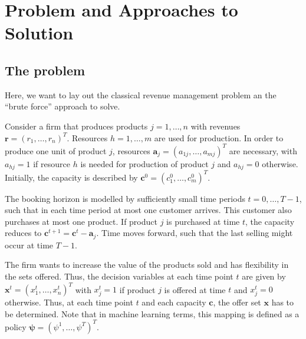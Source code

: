 \chapter{Problem and Approaches to Solution}


\section{The problem}

Here, we want to lay out the classical revenue management problem an the \enquote{brute force} approach to solve. 

Consider a firm that produces products $j = 1, \dots, n$ with revenues $\boldsymbol{r} = (r_1, \dots, r_n)^T$. Resources $h = 1, \dots, m$ are used for production. In order to produce one unit of product $j$, resources $\boldsymbol{a}_j = (a_{1j}, \dots, a_{mj})^T$ are necessary, with $a_{hj}=1$ if resource $h$ is needed for production of product $j$ and $a_{hj} = 0$ otherwise. Initially, the capacity is described by $\boldsymbol{c}^0 = (c_1^0, \dots, c_m^0)^T$. 

The booking horizon is modelled by sufficiently small time periods $t = 0, \dots, T-1$, such that in each time period at most one customer arrives. This customer also purchases at most one product. If product $j$ is purchased at time $t$, the capacity reduces to $\boldsymbol{c}^{t+1} = \boldsymbol{c}^t - \boldsymbol{a}_j$. Time moves forward, such that the last selling might occur at time $T-1$.

The firm wants to increase the value of the products sold and has flexibility in the sets offered. Thus, the decision variables at each time point $t$ are given by $\boldsymbol{x}^t = (x^t_1, \dots, x^t_n)^T$ with $x^t_j = 1$ if product $j$ is offered at time $t$ and $x^t_j = 0$ otherwise. Thus, at each time point $t$ and each capacity $\boldsymbol{c}$, the offer set $\boldsymbol{x}$ has to be determined. Note that in machine learning terms, this mapping is defined as a policy $\boldsymbol{\psi} = (\psi^1, \dots, \psi^T)^T$.

